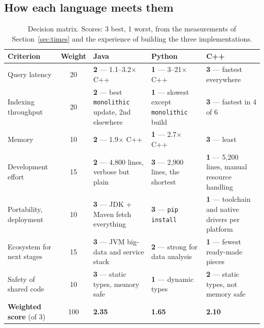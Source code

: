\documentclass[11pt,a4paper]{article}
\newcommand{\code}[1]{\texttt{#1}}
\begin{document}
\subsection{How each language meets them}
\begin{table}[H]
\centering\small
\begin{tabularx}{\linewidth}{@{}L{2.9cm} c Y Y Y@{}}
\toprule
Criterion & Weight & Java & Python & C++ \\
\midrule
Query latency & 20 & \textbf{2} --- 1.1--3.2$\times$ C++ & \textbf{1} --- 3--21$\times$ C++ & \textbf{3} --- fastest everywhere \\
Indexing throughput & 20 & \textbf{2} --- best \code{monolithic} update, 2nd elsewhere & \textbf{1} --- slowest except \code{monolithic} build & \textbf{3} --- fastest in 4 of 6 \\
Memory & 10 & \textbf{2} --- 1.9$\times$ C++ & \textbf{1} --- 2.7$\times$ C++ & \textbf{3} --- least \\
Development effort & 15 & \textbf{2} --- 4,800 lines, verbose but plain & \textbf{3} --- 2,900 lines, the shortest & \textbf{1} --- 5,200 lines, manual resource handling \\
Portability, deployment & 10 & \textbf{3} --- JDK + Maven fetch everything & \textbf{3} --- \code{pip install} & \textbf{1} --- toolchain and native drivers per platform \\
Ecosystem for next stages & 15 & \textbf{3} --- JVM big-data and service stack & \textbf{2} --- strong for data analysis & \textbf{1} --- fewest ready-made pieces \\
Safety of shared code & 10 & \textbf{3} --- static types, memory safe & \textbf{1} --- dynamic types & \textbf{2} --- static types, not memory safe \\
\midrule
\textbf{Weighted score} (of 3) & 100 & \textbf{2.35} & \textbf{1.65} & \textbf{2.10} \\
\bottomrule
\end{tabularx}
\caption{Decision matrix. Scores: 3 best, 1 worst, from the measurements of Section~\ref{sec:times}
and the experience of building the three implementations.}
\label{tab:matrix}
\end{table}
\end{document}
